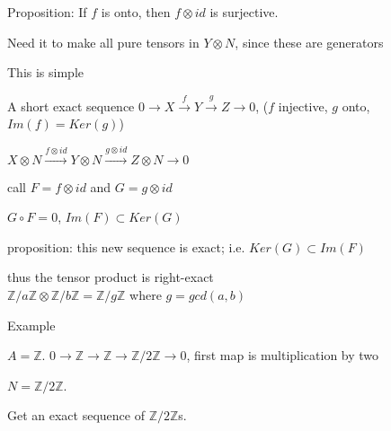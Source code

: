 \documentclass[12pt]{article}
\begin{document}
Proposition: If $f$ is onto, then $f \otimes id$ is surjective.

Need it to make all pure tensors in $Y \otimes N$, since these are generators

This is simple

\noindent
A short exact sequence $0 \to X \xrightarrow{f} Y \xrightarrow{g} Z \to 0$, ($f$ injective, $g$ onto, $Im(f) = Ker(g)$)

$X \otimes N \xrightarrow{f \otimes id} Y \otimes N \xrightarrow{g \otimes id} Z \otimes N \to 0$

call $F = f\otimes id$ and $G = g \otimes id$

$G \circ F = 0$, $Im(F) \subset Ker(G)$

proposition: this new sequence is exact; i.e. $Ker(G) \subset Im(F)$

thus the tensor product is right-exact\\

\noindent
$\mathds{Z}/a\mathds{Z} \otimes \mathds{Z}/b\mathds{Z} = \mathds{Z}/g\mathds{Z}$ where $g = gcd(a, b)$

\noindent
Example

$A = \mathds{Z}$.  $0 \to \mathds{Z} \to \mathds{Z} \to \mathds{Z}/2\mathds{Z} \to 0$, first map is multiplication by two

$N = \mathds{Z}/2\mathds{Z}$.

Get an exact sequence of $\mathds{Z}/2\mathds{Z}$s.
\end{document}
